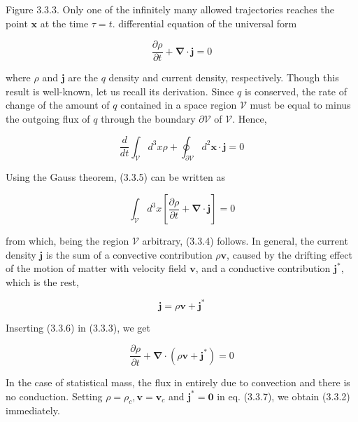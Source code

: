 \documentclass{article}
\begin{document}
Figure 3.3.3. Only one of the infinitely many allowed trajectories reaches the point $\boldsymbol{x}$ at the time $\tau=t$.
differential equation of the universal form
 
\begin{equation*}
\frac{\partial \rho}{\partial t}+\boldsymbol{\nabla} \cdot \boldsymbol{j}=0 \tag{3.3.3}
\end{equation*}
 
where $\rho$ and $\boldsymbol{j}$ are the $q$ density and current density, respectively. Though this result is well-known, let us recall its derivation. Since $q$ is conserved, the rate of change of the amount of $q$ contained in a space region $\mathcal{V}$ must be equal to minus the outgoing flux of $q$ through the boundary $\partial \mathcal{V}$ of $\mathcal{V}$. Hence,
 
\begin{equation*}
\frac{d}{d t} \int_{\mathcal{V}} d^{3} x \rho+\oint_{\partial \mathcal{V}} d^{2} \boldsymbol{x} \cdot \boldsymbol{j}=0 \tag{3.3.4}
\end{equation*}
 

Using the Gauss theorem, (3.3.5) can be written as
 
\begin{equation*}
\int_{\mathcal{V}} d^{3} x\left[\frac{\partial \rho}{\partial t}+\boldsymbol{\nabla} \cdot \boldsymbol{j}\right]=0 \tag{3.3.5}
\end{equation*}
 
from which, being the region $\mathcal{V}$ arbitrary, (3.3.4) follows.
In general, the current density $\boldsymbol{j}$ is the sum of a convective contribution $\rho \boldsymbol{v}$, caused by the drifting effect of the motion of matter with velocity field $\boldsymbol{v}$, and a conductive contribution $\boldsymbol{j}^{*}$, which is the rest,
 
\begin{equation*}
\boldsymbol{j}=\rho \boldsymbol{v}+\boldsymbol{j}^{*} \tag{3.3.6}
\end{equation*}
 

Inserting (3.3.6) in (3.3.3), we get
 
\begin{equation*}
\frac{\partial \rho}{\partial t}+\boldsymbol{\nabla} \cdot\left(\rho \boldsymbol{v}+\boldsymbol{j}^{*}\right)=0 \tag{3.3.7}
\end{equation*}
 

In the case of statistical mass, the flux in entirely due to convection and there is no conduction. Setting $\rho=\rho_{c}, \boldsymbol{v}=\boldsymbol{v}_{c}$ and $\boldsymbol{j}^{*}=\mathbf{0}$ in eq. (3.3.7), we obtain (3.3.2) immediately.
\end{document}
